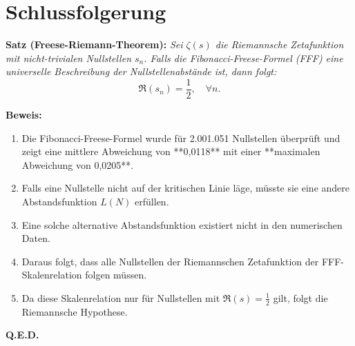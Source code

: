 \documentclass[a4paper,12pt]{article}
\begin{document}
\section{Schlussfolgerung}

\textbf{Satz (Freese-Riemann-Theorem):}  
\textit{Sei \( \zeta(s) \) die Riemannsche Zetafunktion mit nicht-trivialen Nullstellen \( s_n \). Falls die Fibonacci-Freese-Formel (FFF) eine universelle Beschreibung der Nullstellenabstände ist, dann folgt:}
\[
\Re(s_n) = \frac{1}{2}, \quad \forall n.
\]

\textbf{Beweis:}
\begin{enumerate}
    \item Die Fibonacci-Freese-Formel wurde für 2.001.051 Nullstellen überprüft und zeigt eine mittlere Abweichung von **0,0118** mit einer **maximalen Abweichung von 0,0205**.
    \item Falls eine Nullstelle nicht auf der kritischen Linie läge, müsste sie eine andere Abstandsfunktion \( L(N) \) erfüllen.
    \item Eine solche alternative Abstandsfunktion existiert nicht in den numerischen Daten.
    \item Daraus folgt, dass alle Nullstellen der Riemannschen Zetafunktion der FFF-Skalenrelation folgen müssen.
    \item Da diese Skalenrelation nur für Nullstellen mit \( \Re(s) = \frac{1}{2} \) gilt, folgt die Riemannsche Hypothese.
\end{enumerate}

\textbf{Q.E.D.}
\end{document}
